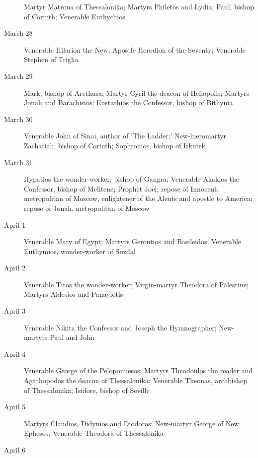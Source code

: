 \begin{description}
Martyr Matrona of Thessalonika; Martyrs Philetos and Lydia; Paul, bishop of Corinth; Venerable Euthychios

\item[March 28]

Venerable Hilarion the New; Apostle Herodion of the Seventy; Venerable Stephen of Triglia

\item[March 29]

Mark, bishop of Arethusa; Martyr Cyril the deacon of Heliopolis; Martyrs Jonah and Barachisios; Eustathios the Confessor, bishop of Bithynia

\item[March 30]

Venerable John of Sinai, author of 'The Ladder;' New-hieromartyr Zachariah, bishop of Corinth; Sophronios, bishop of Irkutsk

\item[March 31]

Hypatios the wonder-worker, bishop of Gangra; Venerable Akakios the Confessor, bishop of Melitene; Prophet Joel; repose of Innocent, metropolitan of Moscow, enlightener of the Aleuts and apostle to America; repose of Jonah, metropolitan of Moscow

\item[April 1]

Venerable Mary of Egypt; Martyrs Gerontios and Basileidos; Venerable Euthymios, wonder-worker of Suzdal

\item[April 2]

Venerable Titos the wonder-worker; Virgin-martyr Theodora of Palestine; Martyrs Aidesios and Panayiotis

\item[April 3]

Venerable Nikita the Confessor and Joseph the Hymnographer; New-martyrs Paul and John

\item[April 4]

Venerable George of the Peloponnesos; Martyrs Theodoulos the reader and Agathopodos the deacon of Thessalonika; Venerable Theonas, archbishop of Thessalonika; Isidore, bishop of Seville

\item[April 5]

Martyrs Claudios, Didymos and Diodoros; New-martyr George of New Ephesos; Venerable Theodora of Thessalonika

\item[April 6]


\end{description}
